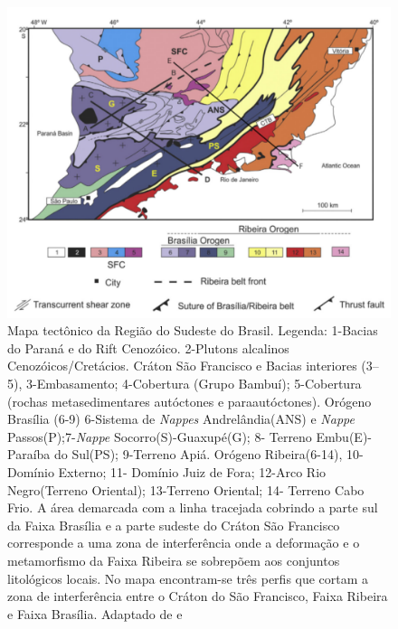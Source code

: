 \begin{figure}[!ht]
\centering
\includegraphics[scale=0.6]{Figs/mapa_geologico.png}
\caption[Mapa tectônico da Região do Sudeste do Brasil segundo  \cite{trouw_new_2013}.]{Mapa tectônico da Região do Sudeste do Brasil. Legenda: 1-Bacias do Paraná e do Rift Cenozóico. 2-Plutons alcalinos Cenozóicos/Cretácios. Cráton São Francisco e Bacias interiores (3–5), 3-Embasamento; 4-Cobertura (Grupo Bambuí); 5-Cobertura (rochas metasedimentares autóctones e paraautóctones). Orógeno Brasília (6-9) 6-Sistema de \textit{Nappes} Andrelândia(ANS) e \textit{Nappe} Passos(P);7-\textit{Nappe} Socorro(S)-Guaxupé(G); 8- Terreno Embu(E)-Paraíba do Sul(PS); 9-Terreno Apiá. Orógeno Ribeira(6-14), 10-Domínio Externo; 11- Domínio Juiz de Fora; 12-Arco Rio Negro(Terreno Oriental); 13-Terreno Oriental; 14- Terreno Cabo Frio. A área demarcada com a linha tracejada cobrindo a parte sul da Faixa Brasília e a parte sudeste do Cráton São Francisco corresponde a uma zona de interferência onde a deformação e o metamorfismo da Faixa Ribeira se sobrepõem aos conjuntos litológicos locais. No mapa encontram-se três perfis que cortam a zona de interferência entre o Cráton do São Francisco, Faixa Ribeira e Faixa Brasília. Adaptado de \cite{trouw_new_2013} e \cite{heilbron_serra_2013}}
\label{mapa_geologico}
\end{figure} 

